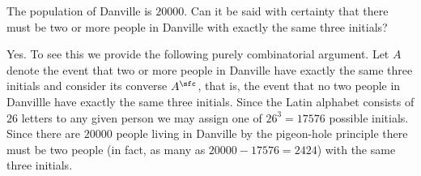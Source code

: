 \begin{problem}[DasGupta, 1.5]
  The population of Danville is \(20000\). Can it be said with certainty
  that there must be two or more people in Danville with exactly the same
  three initials?
\end{problem}
\begin{solution}
  Yes. To see this we provide the following purely combinatorial
  argument. Let \(A\) denote the event that two or more people in Danville
  have exactly the same three initials and consider its converse
  \(A^\sfc\), that is, the event that no two people in Danvillle have
  exactly the same three initials. Since the Latin alphabet consists of
  \(26\) letters to any given person we may assign one of \(26^3=17576\)
  possible initials. Since there are \(20000\) people living in Danville by
  the pigeon-hole principle there must be two people (in fact, as many as
  \(20000-17576=2424\)) with the same three initials.
\end{solution}
\newpage

